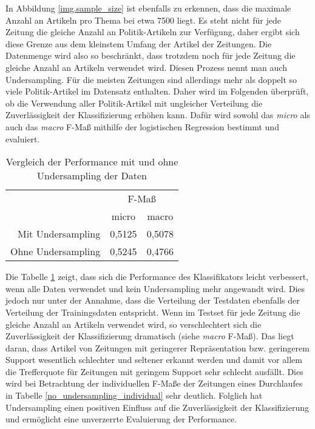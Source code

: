 In Abbildung \ref{img.sample_size} ist ebenfalls zu erkennen, dass die maximale Anzahl an Artikeln pro Thema bei etwa 7500 liegt. Es steht nicht für jede Zeitung die gleiche Anzahl an Politik-Artikeln zur Verfügung, daher ergibt sich diese Grenze aus dem kleinstem Umfang der Artikel der Zeitungen. Die Datenmenge wird also so beschränkt, dass trotzdem noch für jede Zeitung die gleiche Anzahl an Artikeln verwendet wird. Diesen Prozess nennt man auch Undersampling. Für die meisten Zeitungen sind allerdings mehr als doppelt so viele Politik-Artikel im Datensatz enthalten. Daher wird im Folgenden überprüft, ob die Verwendung aller Politik-Artikel mit ungleicher Verteilung die Zuverlässigkeit der Klassifizierung erhöhen kann. Dafür wird sowohl das \textit{micro} als auch das \textit{macro} F-Maß mithilfe der logistischen Regression bestimmt und evaluiert.

\begin{table}[h]
\centering
\begin{spacing}{1.25}
\begin{tabular}[t]{rcc}
\toprule
~ & \multicolumn{2}{c}{F-Maß}\\
~ & micro & macro\\
Mit Undersampling & 0,5125 & 0,5078\\
Ohne Undersampling & 0,5245 & 0,4766\\
\bottomrule
\end{tabular}
\caption{Vergleich der Performance mit und ohne Undersampling der Daten}
\label{undersampling}
\end{spacing}
\end{table}

Die Tabelle \ref{undersampling} zeigt, dass sich die Performance des Klassifikators leicht verbessert, wenn alle Daten verwendet und kein Undersampling mehr angewandt wird. Dies jedoch nur unter der Annahme, dass die Verteilung der Testdaten ebenfalls der Verteilung der Trainingsdaten entspricht. Wenn im Testset für jede Zeitung die gleiche Anzahl an Artikeln verwendet wird, so verschlechtert sich die Zuverlässigkeit der Klassifizierung dramatisch (siehe \textit{macro} F-Maß). Das liegt daran, dass Artikel von Zeitungen mit geringerer Repräsentation bzw. geringerem Support wesentlich schlechter und seltener erkannt werden und damit vor allem die Trefferquote für Zeitungen mit geringem Support sehr schlecht ausfällt. Dies wird bei Betrachtung der individuellen F-Maße der Zeitungen eines Durchlaufes in Tabelle \ref{no_undersampling_individual} sehr deutlich. Folglich hat Undersampling einen positiven Einfluss auf die Zuverlässigkeit der Klassifizierung und ermöglicht eine unverzerrte Evaluierung der Performance.

